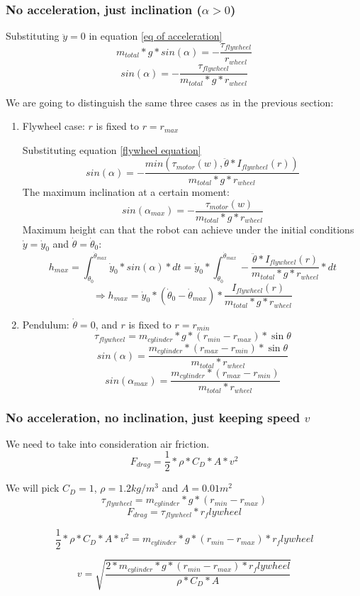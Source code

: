 \subsubsection{No acceleration, just inclination ($\alpha > 0$)}
Substituting $\ddot{y}=0$ in equation \ref{eq of acceleration}
\[m_{total} * g * sin(\alpha) = - \frac{\tau_{flywheel}}{r_{wheel}} \]
\[sin(\alpha) = - \frac{\tau_{flywheel}}{m_{total} * g * r_{wheel}} \]

We are going to distinguish the same three cases as in the previous section:
\begin{enumerate}
    \item Flywheel case: $r$ is fixed to $r = r_{max}$
    
    Substituting equation \ref{flywheel equation}
    \[sin(\alpha) = - \frac{min(\tau_{motor} (w), \ddot{\theta}*I_{flywheel}(r))}{m_{total} * g * r_{wheel}} \]
    The maximum inclination at a certain moment:
    \begin{equation}\label{Maximum angle using flywheel system}
        sin(\alpha_{max}) = - \frac{\tau_{motor} (w)}{m_{total} * g * r_{wheel}}
    \end{equation}
    Maximum height can that the robot can achieve under the initial conditions $\dot{y}=\dot{y}_0$ and $\dot{\theta}=\dot{\theta}_0$:
    \[h_{max}=\int_{\dot{\theta}_0}^{\dot{\theta}_{max}} \dot{y}_0*sin(\alpha) * dt  = \dot{y}_0* \int_{\dot{\theta}_0}^{\dot{\theta}_{max}} - \frac{\ddot{\theta}*I_{flywheel}(r)}{m_{total} * g * r_{wheel}} * dt\]
    \[\boxed{\Rightarrow h_{max}= \dot{y}_0* (\dot{\theta}_0-\dot{\theta}_{max}) * \frac{I_{flywheel}(r)}{m_{total} * g * r_{wheel}}}\]

    \item Pendulum: $\dot{\theta} = 0$, and $r$ is fixed to $r = r_{min}$
    \[\tau_{flywheel} = m_{cylinder} * g * (r_{min} - r_{max}) * \sin{\theta}\]
    \[sin(\alpha) = \frac{m_{cylinder} * (r_{max}- r_{min}) * \sin{\theta}}{m_{total} * r_{wheel}} \]
    \begin{equation}\label{Maximum angle using pendulum system}
        sin(\alpha_{max}) = \frac{m_{cylinder} * (r_{max}- r_{min})}{m_{total} * r_{wheel}}
    \end{equation}
\end{enumerate}

\subsubsection{No acceleration, no inclination, just keeping speed $v$}
We need to take into consideration air friction.
\[F_{drag} = \frac{1}{2}*\rho*C_D * A * v^2 \]

We will pick $C_D=1$, $\rho=1.2 kg/m^3$ and $A=0.01 m^2$
\[\tau_{flywheel} = m_{cylinder} * g * (r_{min} - r_{max})\]
\[F_{drag} = \tau_{flywheel} * r_flywheel\]

\[\frac{1}{2}*\rho*C_D * A * v^2 = m_{cylinder} * g * (r_{min} - r_{max}) * r_flywheel \]

\[v = \sqrt{\frac{2*m_{cylinder} * g * (r_{min} - r_{max}) * r_flywheel}{\rho*C_D * A} } \]